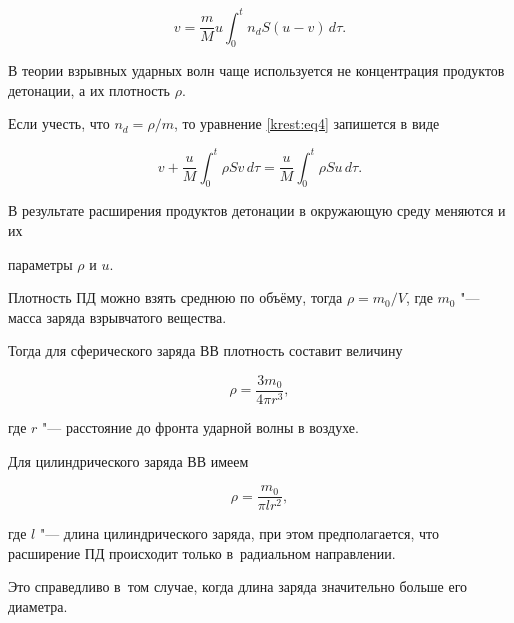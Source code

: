 \begin{equation}

\label{krest:eq4}

v=\frac{m}{M} u \int_0^t n_d S  (u-v)\,d\tau.

\end{equation}



В теории взрывных ударных волн чаще используется не концентрация продуктов детонации, а их плотность $\rho$. 

Если учесть, что $n_d =\rho/m$, то уравнение \eqref{krest:eq4} запишется в виде

\begin{equation}

\label{krest:eq5}

v+\frac{u}{M} \int _0^t \rho S v\, d\tau =\frac{u}{M} \int _0^t \rho S u\, d\tau.

\end{equation}



В результате расширения продуктов детонации в окружающую среду меняются и их

параметры $\rho $ и $u$. 

Плотность ПД можно взять среднюю по объёму, тогда $\rho = m_0/V$, где $m_0$ "--- масса заряда взрывчатого вещества. 

Тогда для сферического заряда ВВ плотность составит величину

\begin{equation}

\label{krest:eq6}

\rho =\frac{3 m_0}{4 \pi r^3},

\end{equation}

где $r$ "--- расстояние до фронта ударной волны в воздухе.



Для цилиндрического заряда ВВ имеем

\begin{equation}

\label{krest:eq7}

\rho =\frac{m_0}{\pi l r^2},

\end{equation}

где $l$ "--- длина цилиндрического заряда, при этом предполагается, что расширение ПД происходит только в~радиальном направлении. 

Это справедливо в~том случае, когда длина заряда значительно больше его диаметра.



